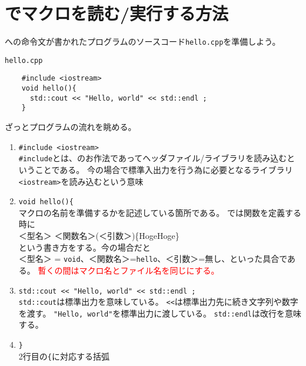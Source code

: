 \clearpage
 \section{\ROOT でマクロを読む/実行する方法}
 \ROOT への命令文が書かれたプログラムのソースコード\verb|hello.cpp|を準備しよう。
 \begin{itembox}{\texttt{hello.cpp}}
\begin{verbatim}
	#include <iostream>
	void hello(){
	  std::cout << "Hello, world" << std::endl ;
	}
\end{verbatim}
 \end{itembox}
 ざっとプログラムの流れを眺める。
 \begin{enumerate}
  \item \verb|#include <iostream>| \\
	\verb|#include|とは、\Cpp のお作法であってヘッダファイル/ライブラリを読み込むということである。
	今の場合\Cpp で標準入出力を行う為に必要となるライブラリ\verb|<iostream>|を読み込むという意味
  \item \verb|void hello(){| \\
	マクロの名前を準備するかを記述している箇所である。
	\Cpp では関数を定義する時に \\
	＜型名＞ ＜関数名＞(＜引数＞)\{HogeHoge\} \\
	という書き方をする。今の場合だと\\
	＜型名＞ = \verb|void|、＜関数名＞=\verb|hello|、＜引数＞=無し、といった具合である。
	\textcolor{red}{暫くの間はマクロ名とファイル名を同じにする。}

  \item \verb|std::cout << "Hello, world" << std::endl ;| \\
	\verb|std::cout|は標準出力を意味している。
	\verb|<<|は標準出力先に続き文字列や数字を渡す。
	\verb|"Hello, world"|を標準出力に渡している。
	\verb|std::endl|は改行を意味する。

  \item \verb|}| \\
	2行目の\verb|{|に対応する括弧
 \end{enumerate}

